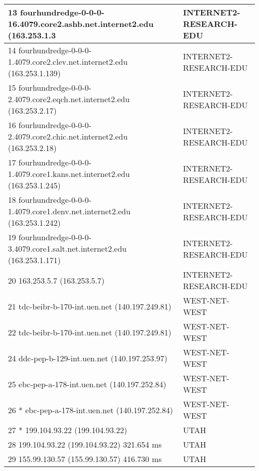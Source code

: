 \begin{table}[!ht]
\begin{tabular}{|l|l|}
13  fourhundredge-0-0-0-16.4079.core2.ashb.net.internet2.edu (163.253.1.3   & INTERNET2-RESEARCH-EDU           \\ \hline
14  fourhundredge-0-0-0-1.4079.core2.clev.net.internet2.edu (163.253.1.139) & INTERNET2-RESEARCH-EDU           \\ \hline
15  fourhundredge-0-0-0-2.4079.core2.eqch.net.internet2.edu (163.253.2.17)  & INTERNET2-RESEARCH-EDU           \\ \hline
16  fourhundredge-0-0-0-2.4079.core2.chic.net.internet2.edu (163.253.2.18)  & INTERNET2-RESEARCH-EDU           \\ \hline
17  fourhundredge-0-0-0-1.4079.core1.kans.net.internet2.edu (163.253.1.245) & INTERNET2-RESEARCH-EDU           \\ \hline
18  fourhundredge-0-0-0-1.4079.core1.denv.net.internet2.edu (163.253.1.242) & INTERNET2-RESEARCH-EDU           \\ \hline
19  fourhundredge-0-0-0-3.4079.core1.salt.net.internet2.edu (163.253.1.171) & INTERNET2-RESEARCH-EDU           \\ \hline
20  163.253.5.7 (163.253.5.7)                                               & INTERNET2-RESEARCH-EDU           \\ \hline
21  tdc-beibr-b-170-int.uen.net (140.197.249.81)                            & WEST-NET-WEST                    \\ \hline
22  tdc-beibr-b-170-int.uen.net (140.197.249.81)                            & WEST-NET-WEST                    \\ \hline
24  ddc-pep-b-129-int.uen.net (140.197.253.97)                              & WEST-NET-WEST                    \\ \hline
25  ebc-pep-a-178-int.uen.net (140.197.252.84)                              & WEST-NET-WEST                    \\ \hline
26  * ebc-pep-a-178-int.uen.net (140.197.252.84)                            & WEST-NET-WEST                    \\ \hline
27  * 199.104.93.22 (199.104.93.22)                                         & UTAH                                                                            \\ \hline
28  199.104.93.22 (199.104.93.22)  321.654 ms                               & UTAH                                                                            \\ \hline
29  155.99.130.57 (155.99.130.57)  416.730 ms                               & UTAH                                                                            \\ \hline

\end{tabular}
\end{table}
